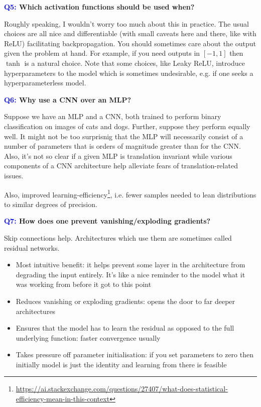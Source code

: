 \documentclass[11pt]{article}
\begin{document}
\begin{center}
    \textbf{\textcolor{blue}{Q5:} Which activation functions should be used when?}
\end{center}
Roughly speaking, I wouldn't worry too much about this in practice. The usual choices are all nice and differentiable (with small caveats here and there, like with ReLU) facilitating backpropagation. You should sometimes care about the output given the problem at hand. For example, if you need outputs in $[-1,1]$ then $\tanh$ is a natural choice. Note that some choices, like Leaky ReLU, introduce hyperparameters to the model which is sometimes undesirable, e.g. if one seeks a hyperparameterless model.

\begin{center}
    \textbf{\textcolor{blue}{Q6:} Why use a CNN over an MLP?}
\end{center}
Suppose we have an MLP and a CNN, both trained to perform binary classification on images of cats and dogs. Further, suppose they perform equally well. It might not be too surprisnig that the MLP will necessarily consist of a number of parameters that is orders of magnitude greater than for the CNN. Also, it's not so clear if a given MLP is translation invariant while various components of a CNN architecture help alleviate fears of translation-related issues.

Also, improved learning-efficiency\footnote{\url{https://ai.stackexchange.com/questions/27407/what-does-statistical-efficiency-mean-in-this-context}}, i.e. fewer samples needed to lean distributions to similar degrees of precision.

\begin{center}
    \textbf{\textcolor{blue}{Q7:} How does one prevent vanishing/exploding gradients?}
\end{center}

\noindent Skip connections help. Architectures which use them are sometimes called residual networks.
\begin{itemize}
    \item Most intuitive benefit: it helps prevent some layer in the architecture from degrading the input entirely. It's like a nice reminder to the model what it was working from before it got to this point
    \item Reduces vanishing or exploding gradients: opens the door to far deeper architectures
    \item Ensures that the model has to learn the residual as opposed to the full underlying function: faster convergence usually
    \item Takes pressure off parameter initialisation: if you set parameters to zero then initially model is just the identity and learning from there is feasible
\end{itemize}
\end{document}
